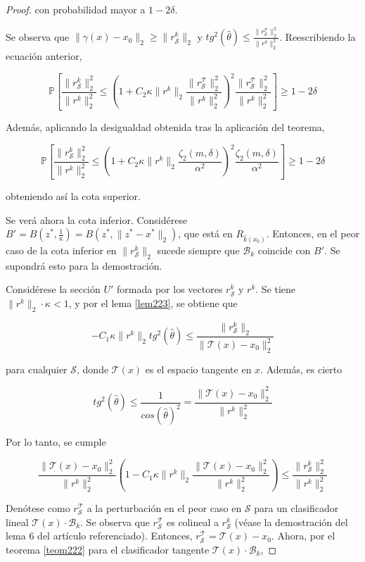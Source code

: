 \begin{proof}
con probabilidad mayor a $1-2\delta$.

Se observa que $\|\gamma(x)-x_0 \|_2 \geq \|r_\mathcal{S}^k \|_2$ y $tg^2(\widehat{\theta}) \leq \frac{\|r_\mathcal{S}^\mathcal{T}\|_2^2}{\|r^k \|_2^2}$. Reescribiendo la ecuación anterior,

$$\mathbb{P} \left[ \frac{\|r_\mathcal{S}^k \|_2^2}{\|r^k\|_2^2} \leq \left( 1 + C_2 \kappa \|r^k \|_2 \frac{\|r_\mathcal{S}^\mathcal{T} \|_2^2}{\|r^k \|_2^2} \right)^2 \frac{\|r_\mathcal{S}^\mathcal{T} \|_2^2}{\|r^k \|_2^2} \right] \geq 1-2\delta$$

Además, aplicando la desigualdad obtenida tras la aplicación del teorema, 

$$\mathbb{P} \left[ \frac{\|r_\mathcal{S}^k \|_2^2}{\|r^k \|_2^2} \leq \left( 1 + C_2 \kappa \|r^k \|_2 \frac{\zeta_2 (m,\delta)}{\alpha^2} \right)^2 \frac{\zeta_2 (m,\delta)}{\alpha^2} \right] \geq 1 - 2\delta$$

obteniendo así la cota superior.

Se verá ahora la cota inferior. Considérese $B' = B(z^*,\frac{1}{\kappa}) = B(z^*,\|z^* - x^*\|_2)$, que está en $R_{\widehat{k}(x_0)}$. Entonces, en el peor caso de la cota inferior en $\|r_\mathcal{S}^k \|_2$ sucede siempre que $\mathcal{B}_k$ coincide con $B'$. Se supondrá esto para la demostración.

Considérese la sección $U'$ formada por los vectores $r_\mathcal{S}^k$ y $r^k$. Se tiene $\|r^k \|_2 \cdot \kappa < 1$, y por el lema \ref{lem223}, se obtiene que

$$-C_1 \kappa \|r^k \|_2 tg^2(\widehat{\theta}) \leq \frac{\|r_\mathcal{S}^k \|_2}{\|\mathcal{T}(x)-x_0 \|_2^2}$$

para cualquier $\mathcal{S}$, donde $\mathcal{T}(x)$ es el espacio tangente en $x$. Además, es cierto

$$tg^2(\widehat{\theta}) \leq \frac{1}{cos(\widehat{\theta})^2} = \frac{\|\mathcal{T}(x) - x_0 \|_2^2}{\|r^k \|_2^2}$$

Por lo tanto, se cumple

$$\frac{\|\mathcal{T}(x)-x_0 \|_2^2}{\|r^k \|_2^2} \left( 1 - C_1 \kappa \|r^k \|_2 \frac{\|\mathcal{T}(x)-x_0 \|_2^2}{\|r^k \|_2^2} \right) \leq \frac{\|r_\mathcal{S}^k \|_2^2}{\|r^k \|_2^2}$$

Denótese como $r_\mathcal{S}^\mathcal{T}$ a la perturbación en el peor caso en $\mathcal{S}$ para un clasificador lineal $\mathcal{T}(x) \cdot \mathcal{B}_k$. Se observa que $r_\mathcal{S}^\mathcal{T}$ es colineal a $r_\mathcal{S}^k$ (véase la demostración del lema 6 del artículo referenciado). Entonces, $r_\mathcal{S}^\mathcal{T} = \mathcal{T}(x) - x_0$. Ahora, por el teorema \ref{teom222} para el clasificador tangente $\mathcal{T}(x) \cdot \mathcal{B}_k$,


\end{proof}
